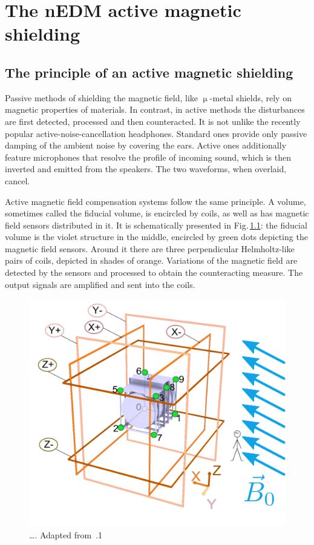 \chapter{The nEDM active magnetic shielding}

\label{ch:nedm_sfc}


\section{The principle of an active magnetic shielding}
Passive methods of shielding the magnetic field, like $\upmu$-metal shields, rely on magnetic properties of materials. In contrast, in active methods the disturbances are first detected, processed and then counteracted. It is not unlike the recently popular active-noise-cancellation headphones. Standard ones provide only passive damping of the ambient noise by covering the ears. Active ones additionally feature microphones that resolve the profile of incoming sound, which is then inverted and emitted from the speakers. The two waveforms, when overlaid, cancel.

Active magnetic field compensation systems follow the same principle. A volume, sometimes called the fiducial volume, is encircled by coils, as well as has magnetic field sensors distributed in it. It is schematically presented in Fig.\,\ref{fig:sfc-scheme}: the fiducial volume is the violet structure in the middle, encircled by green dots depicting the magnetic field sensors. Around it there are three perpendicular Helmholtz-like pairs of coils, depicted in shades of orange. Variations of the magnetic field are detected by the sensors and processed to obtain the counteracting measure. The output signals are amplified and sent into the coils.

\begin{figure}
  \centering
  \includegraphics[width=0.8\linewidth]{gfx/nEDM_SFC/SFCplain.pdf}
  \caption{\ldots. Adapted from~\cite{Franke2013}.1}
  \label{fig:sfc-scheme}
\end{figure}

